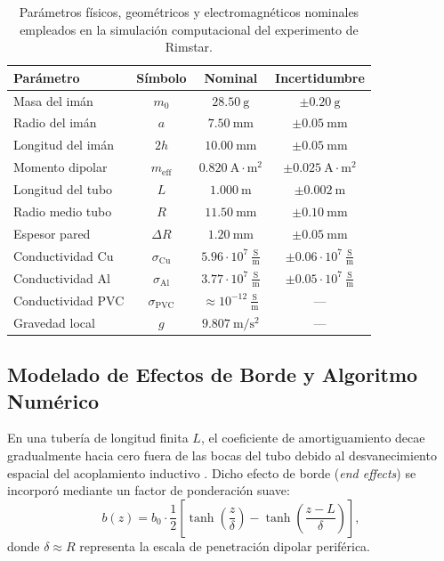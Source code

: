 \documentclass[aps,prb,reprint,twocolumn,superscriptaddress,amsmath,amssymb,floatfix]{revtex4-2}
\begin{document}
\begin{table}[htbp]
\centering
\footnotesize
\setlength{\tabcolsep}{2.5pt}
\caption{Parámetros físicos, geométricos y electromagnéticos nominales empleados en la simulación computacional del experimento de Rimstar.}
\label{tab:parametros}
\begin{ruledtabular}
\begin{tabular}{lccc}
\textbf{Parámetro} & \textbf{Símbolo} & \textbf{Nominal} & \textbf{Incertidumbre} \\
\hline
Masa del imán & $m_0$ & $28.50\ \mathrm{g}$ & $\pm 0.20\ \mathrm{g}$ \\
Radio del imán & $a$ & $7.50\ \mathrm{mm}$ & $\pm 0.05\ \mathrm{mm}$ \\
Longitud del imán & $2h$ & $10.00\ \mathrm{mm}$ & $\pm 0.05\ \mathrm{mm}$ \\
Momento dipolar & $m_{\mathrm{eff}}$ & $0.820\ \mathrm{A\cdot m^2}$ & $\pm 0.025\ \mathrm{A\cdot m^2}$ \\
Longitud del tubo & $L$ & $1.000\ \mathrm{m}$ & $\pm 0.002\ \mathrm{m}$ \\
Radio medio tubo & $R$ & $11.50\ \mathrm{mm}$ & $\pm 0.10\ \mathrm{mm}$ \\
Espesor pared & $\Delta R$ & $1.20\ \mathrm{mm}$ & $\pm 0.05\ \mathrm{mm}$ \\
Conductividad Cu & $\sigma_{\mathrm{Cu}}$ & $5.96 \cdot 10^7\ \frac{\mathrm{S}}{\mathrm{m}}$ & $\pm 0.06 \cdot 10^7\ \frac{\mathrm{S}}{\mathrm{m}}$ \\
Conductividad Al & $\sigma_{\mathrm{Al}}$ & $3.77 \cdot 10^7\ \frac{\mathrm{S}}{\mathrm{m}}$ & $\pm 0.05 \cdot 10^7\ \frac{\mathrm{S}}{\mathrm{m}}$ \\
Conductividad PVC & $\sigma_{\mathrm{PVC}}$ & $\approx 10^{-12}\ \frac{\mathrm{S}}{\mathrm{m}}$ & --- \\
Gravedad local & $g$ & $9.807\ \mathrm{m/s^2}$ & --- \\
\end{tabular}
\end{ruledtabular}
\end{table}

\subsection{Modelado de Efectos de Borde y Algoritmo Numérico}
En una tubería de longitud finita $L$, el coeficiente de amortiguamiento decae gradualmente hacia cero fuera de las bocas del tubo debido al desvanecimiento espacial del acoplamiento inductivo \cite{Partovi2006}. Dicho efecto de borde (\textit{end effects}) se incorporó mediante un factor de ponderación suave:
\begin{equation}
b(z) = b_0 \cdot \frac{1}{2} \left[ \tanh\left(\frac{z}{\delta}\right) - \tanh\left(\frac{z - L}{\delta}\right) \right],
\label{eq:edge}
\end{equation}
donde $\delta \approx R$ representa la escala de penetración dipolar periférica. 
\end{document}
